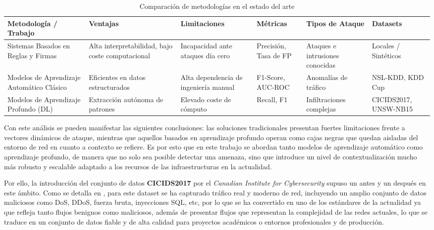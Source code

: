 \documentclass[12pt]{article}
\numberwithin{equation}{section} %
\begin{document}
    \begin{table}[htbp]
        \centering
        \renewcommand{\arraystretch}{1.5}
        \caption{Comparación de metodologías en el estado del arte}
        \label{tab:comparativa_estado_arte}
        \small
        \begin{tabular}{|C{2.3cm}|C{2.2cm}|C{2.2cm}|C{2cm}|C{2cm}|C{2.2cm}|}
        \hline
        \textbf{Metodología / Trabajo} & \textbf{Ventajas} & \textbf{Limitaciones} & \textbf{Métricas} & \textbf{Tipos de Ataque} & \textbf{Datasets} \\ \hline
        Sistemas Basados en Reglas y Firmas & Alta interpretabilidad, bajo coste computacional & Incapacidad ante ataques día cero & Precisión, Tasa de FP & Ataques e intrusiones conocidas & Locales / Sintéticos \\ \hline
        Modelos de Aprendizaje Automático Clásico & Eficientes en datos estructurados & Alta dependencia de ingeniería manual & F1-Score, AUC-ROC & Anomalías de tráfico & NSL-KDD, KDD Cup \\ \hline
        Modelos de Aprendizaje Profundo (DL) & Extracción autónoma de patrones & Elevado coste de cómputo & Recall, F1 & Infiltraciones complejas & CICIDS2017, UNSW-NB15 \\ \hline
        \end{tabular}
    \end{table}

    \vspace{5mm}

    Con este análisis se pueden manifestar las siguientes conclusiones: las soluciones tradicionales presentan fuertes limitaciones frente a vectores dinámicos de ataque, mientras que aquellos basados en aprendizaje profundo operan como cajas negras que quedan aisladas del entorno de red en cuanto a contexto se refiere. Es por esto que en este trabajo se abordan tanto modelos de aprendizaje automático como aprendizaje profundo, de manera que no solo sea posible detectar una amenaza, sino que introduce un nivel de contextualización mucho más robusto y escalable adaptado a los recursos de las infraestructuras en la actualidad.

    \vspace{5mm}

    Por ello, la introducción del conjunto de datos \textbf{CICIDS2017} por el \textit{Canadian Institute for Cybersecurity} supuso un antes y un después en este ámbito. Como se detalla en \cite{sharafaldin2018toward}, para este dataset se ha capturado tráfico real y moderno de red, incluyendo un amplio conjunto de datos maliciosos como DoS, DDoS, fuerza bruta, inyecciones SQL, etc, por lo que se ha convertido en uno de los estándares de la actualidad ya que refleja tanto flujos benignos como maliciosos, además de presentar flujos que representan la complejidad de las redes actuales, lo que se traduce en un conjunto de datos fiable y de alta calidad para proyectos académicos o entornos profesionales y de producción. 
    
\end{document}
